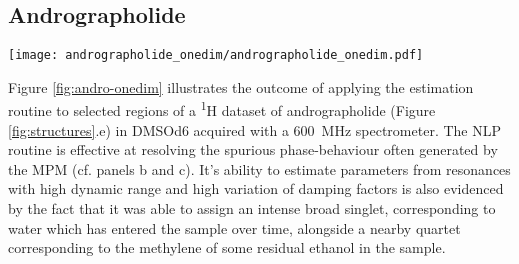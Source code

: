 \subsection{Andrographolide}
\begin{sidewaysfigure}
    \centering
    \texttt{[image: andrographolide\_onedim/andrographolide\_onedim.pdf]}
    \caption[
        Result of applying the estimation routine to selected regions of a
        pulse-acquire dataset of andrographolide.
    ]{
        Result of applying the estimation routine to selected regions of a
        pulse-acquire dataset of andrographolide in \acs{DMSOd6}.
        \textbf{a.} Spectral data corresponding to the regions considered.
        \textbf{b.} The result of applying the \acs{MPM} to the regions, with
        the model order predicted with the \acs{MDL}. Blue/red lines: peaks of
        individual oscillators, grey line above: the model (sum of all
        oscillators), grep line below: the residual between the data and the model.
        \textbf{c.} The result after convergence of the \acs{NLP} routine, again
        with the model above and residual below.
        Red peaks in panel b correspond to oscillators which acquire negative
        amplitudes during the \acs{NLP} routine, and are subsequently purged.
        Note that one of the reasons estimated has been split in two in the
        figure to save space, with one half, featuring a signal from ethanol,
        being magnified.
    }
    \label{fig:andro-onedim}
\end{sidewaysfigure}
Figure \ref{fig:andro-onedim} illustrates the outcome of applying the
estimation routine to selected regions of a \textsuperscript{1}H dataset of
andrographolide (Figure \ref{fig:structures}.e) in \acs{DMSOd6} acquired with
a \qty{600}{\mega\hertz} spectrometer. The \ac{NLP}
routine is effective at resolving the spurious phase-behaviour often generated
by the \ac{MPM} (cf. panels b and c).
It's ability to estimate parameters from resonances with high
dynamic range and high variation of damping factors is also evidenced by the
fact that it was able to assign an intense broad singlet, corresponding to
water which has entered the sample over time, alongside a nearby quartet
corresponding to the methylene of some residual ethanol in the sample.

